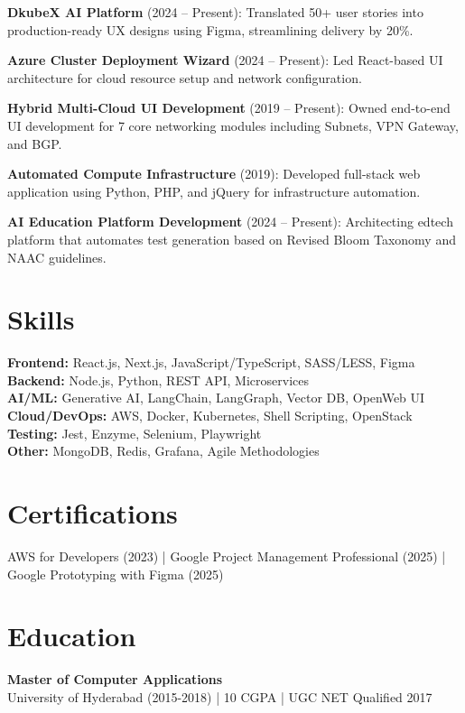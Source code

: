 \documentclass[10pt, a4paper]{article}
\newcommand{\smallgray}[1]{\textcolor{darkgray!90}{\small #1}}
\begin{document}
\textbf{DkubeX AI Platform} (2024 -- Present): Translated 50+ user stories into production-ready UX designs using Figma, streamlining delivery by 20\%.

\textbf{Azure Cluster Deployment Wizard} (2024 -- Present): Led React-based UI architecture for cloud resource setup and network configuration.

\textbf{Hybrid Multi-Cloud UI Development} (2019 -- Present): Owned end-to-end UI development for 7 core networking modules including Subnets, VPN Gateway, and BGP.

\textbf{Automated Compute Infrastructure} (2019): Developed full-stack web application using Python, PHP, and jQuery for infrastructure automation.

\textbf{AI Education Platform Development} (2024 -- Present): Architecting edtech platform that automates test generation based on Revised Bloom Taxonomy and NAAC guidelines.

\section{Skills}
\textbf{Frontend:} React.js, Next.js, JavaScript/TypeScript, SASS/LESS, Figma \\
\textbf{Backend:} Node.js, Python, REST API, Microservices \\
\textbf{AI/ML:} Generative AI, LangChain, LangGraph, Vector DB, OpenWeb UI \\
\textbf{Cloud/DevOps:} AWS, Docker, Kubernetes, Shell Scripting, OpenStack \\
\textbf{Testing:} Jest, Enzyme, Selenium, Playwright \\
\textbf{Other:} MongoDB, Redis, Grafana, Agile Methodologies

\section{Certifications}
AWS for Developers (2023) | Google Project Management Professional (2025) | Google Prototyping with Figma (2025)

\section{Education}
\textbf{Master of Computer Applications} \\
\smallgray{University of Hyderabad (2015-2018) | 10 CGPA | UGC NET Qualified 2017}

\end{document}
